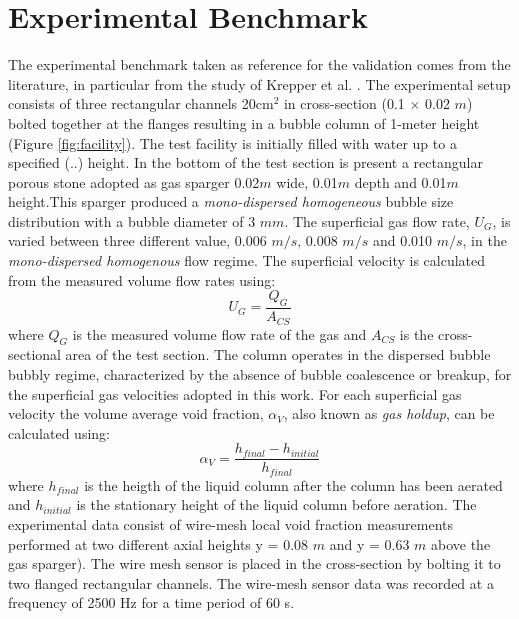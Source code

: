 \documentclass[11pt,a4paper]{article}
\begin{document}
\section{Experimental Benchmark}
\label{sec:expbench}
The  experimental benchmark taken as reference for the validation comes from the literature, in particular from the study of Krepper et al. \cite{krepper}. The experimental setup consists of three rectangular channels 20cm$^2$ in cross-section (0.1 $\times$ 0.02 $m$) bolted together at the flanges resulting in a bubble column of 1-meter height (Figure \ref{fig:facility}). The test facility is initially filled with water up to a specified (..) height. In the bottom of the test section is present a rectangular porous stone adopted as gas sparger 0.02$m$ wide, 0.01$m$ depth and 0.01$m$ height.This sparger produced a \textit{mono-dispersed homogeneous} bubble size distribution with a bubble diameter of 3 $mm$. The superficial gas flow rate, $U_G$, is varied between three different value, 0.006 $m/s$, 0.008 $m/s$ and 0.010 $m/s$, in the \textit{mono-dispersed homogenous} flow regime. The superficial velocity is calculated from the measured volume flow rates using: 
\begin{equation}
    U_G=\frac{Q_G}{A_{CS}}
\end{equation}
where $Q_G$ is the measured volume flow rate of the gas and $A_{CS}$ is the cross-sectional area of the test section. The column operates in the dispersed bubble bubbly regime, characterized by the absence of bubble coalescence or breakup, for the superficial gas velocities adopted in this work. For each superficial gas velocity the volume average void fraction, $\alpha_V$, also known as \textit{gas holdup}, can be calculated using: 
\begin{equation}
    \alpha_V=\frac{h_{final}-h_{initial}}{h_{final}}
\end{equation}
where $h_{final}$ is the heigth of the liquid column after the column has been aerated and $h_{initial}$ is the stationary height of the liquid column before aeration. The experimental data consist of wire-mesh local void fraction measurements performed at two different axial heights y = 0.08 $m$ and y = 0.63 $m$ above the gas sparger). The wire mesh sensor is placed in the cross-section by bolting it to two flanged rectangular channels. The wire-mesh sensor data was recorded at a frequency of 2500 Hz for a time period of 60 s. 
\clearpage
\end{document}
